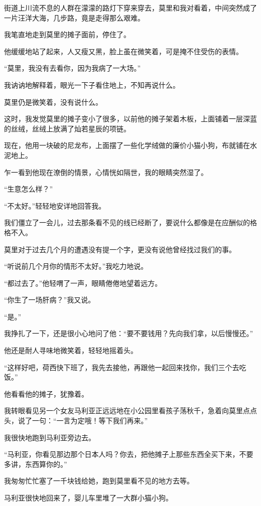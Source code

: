 \par 街道上川流不息的人群在濛濛的路灯下穿来穿去，莫里和我对看着，中间突然成了一片汪洋大海，几步路，竟是走得那么艰难。
\par 我笔直地走到莫里的摊子面前，停住了。
\par 他缓缓地站了起来，人又瘦又黑，脸上虽在微笑着，可是掩不住受伤的表情。
\par “莫里，我没有去看你，因为我病了一大场。”
\par 我讷讷地解释着，眼光一下子看住地上，不知再说什么。
\par 莫里仍是微笑着，没有说什么。
\par 这时，我发觉莫里的摊子变小了很多，以前他的摊子架着木板，上面铺着一层深蓝的丝绒，丝绒上放满了灿若星辰的项链。
\par 现在，他用一块破的尼龙布，上面摆了一些化学绒做的廉价小猫小狗，布就铺在水泥地上。
\par 乍一看到他现在潦倒的情景，心情恍如隔世，我的眼睛突然湿了。
\par “生意怎么样？”
\par “不太好。”轻轻地安详地回答我。
\par 我们僵立了一会儿，过去那条看不见的线已经断了，要说什么都像是在应酬似的格格不入。
\par 莫里对于过去几个月的遭遇没有提一个字，更没有说他曾经找过我们的事。
\par “听说前几个月你的情形不太好。”我吃力地说。
\par “都过去了。”他轻喟了一声，眼睛倦倦地望着远方。
\par “你生了一场肝病？”我又说。
\par “是。”
\par 我挣扎了一下，还是很小心地问了他：“要不要钱用？先向我们拿，以后慢慢还。”
\par 他还是耐人寻味地微笑着，轻轻地摇着头。
\par “这样好吧，荷西快下班了，我先去接他，再跟他一起回来找你，我们三个去吃饭。”
\par 他看看他的摊子，犹豫着。
\par 我转眼看见另一个女友马利亚正远远地在小公园里看孩子荡秋千，急着向莫里点点头，说了一句：“一言为定哦！等下我们再来。”
\par 我很快地跑到马利亚旁边去。
\par “马利亚，你看见那边那个日本人吗？你去，把他摊子上那些东西全买下来，不要多讲，东西算你的。”
\par 我匆匆忙忙塞了一千块钱给她，跑到莫里看不见的地方去等。
\par 马利亚很快地回来了，婴儿车里堆了一大群小猫小狗。
